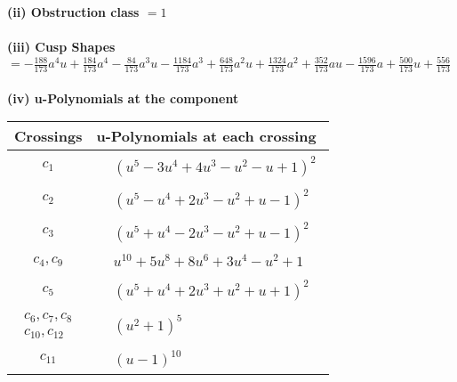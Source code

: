 \documentclass[1p]{elsarticle_modified}
\theoremstyle{definition}
\begin{document}
\flushleft \textbf{(ii) Obstruction class $= 1$}\\~\\
\flushleft \textbf{(iii) Cusp Shapes $= -\frac{188}{173} a^4 u+\frac{184}{173} a^4-\frac{84}{173} a^3 u-\frac{1184}{173} a^3+\frac{648}{173} a^2 u+\frac{1324}{173} a^2+\frac{352}{173} a u-\frac{1596}{173} a+\frac{500}{173} u+\frac{556}{173}$}\\~\\
\newpage\renewcommand{\arraystretch}{1}
\flushleft \textbf{(iv) u-Polynomials at the component}\newline \\
\begin{tabular}{m{50pt}|m{274pt}}
Crossings & \hspace{64pt}u-Polynomials at each crossing \\
\hline $$\begin{aligned}c_{1}\end{aligned}$$&$\begin{aligned}
&(u^5-3 u^4+4 u^3- u^2- u+1)^2
\end{aligned}$\\
\hline $$\begin{aligned}c_{2}\end{aligned}$$&$\begin{aligned}
&(u^5- u^4+2 u^3- u^2+u-1)^2
\end{aligned}$\\
\hline $$\begin{aligned}c_{3}\end{aligned}$$&$\begin{aligned}
&(u^5+u^4-2 u^3- u^2+u-1)^2
\end{aligned}$\\
\hline $$\begin{aligned}c_{4},c_{9}\end{aligned}$$&$\begin{aligned}
&u^{10}+5 u^8+8 u^6+3 u^4- u^2+1
\end{aligned}$\\
\hline $$\begin{aligned}c_{5}\end{aligned}$$&$\begin{aligned}
&(u^5+u^4+2 u^3+u^2+u+1)^2
\end{aligned}$\\
\hline $$\begin{aligned}c_{6},c_{7},c_{8}\\c_{10},c_{12}\end{aligned}$$&$\begin{aligned}
&(u^2+1)^5
\end{aligned}$\\
\hline $$\begin{aligned}c_{11}\end{aligned}$$&$\begin{aligned}
&(u-1)^{10}
\end{aligned}$\\
\hline
\end{tabular}\\~\\
\end{document}
